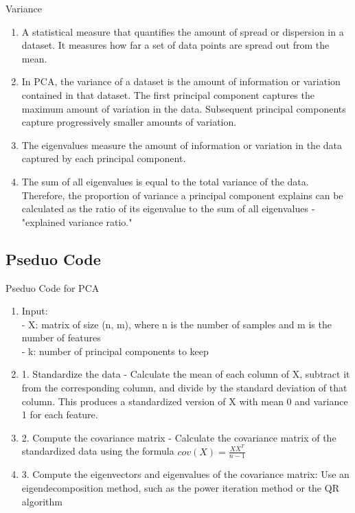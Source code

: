 \documentclass{beamer}
\begin{document}
\begin{frame}{Variance}
    \begin{enumerate}
        \item A statistical measure that quantifies the amount of spread or dispersion in a dataset. It measures how far a set of data points are spread out from the mean.
        \item  In PCA, the variance of a dataset is the amount of information or variation contained in that dataset. The first principal component captures the maximum amount of variation in the data. Subsequent principal components capture progressively smaller amounts of variation.
        \item The eigenvalues measure the amount of information or variation in the data captured by each principal component.
        \item The sum of all eigenvalues is equal to the total variance of the data. Therefore, the proportion of variance a principal component explains can be calculated as the ratio of its eigenvalue to the sum of all eigenvalues - "explained variance ratio."

    \end{enumerate}
\end{frame}

\subsection{Pseduo Code}
\begin{frame}{Pseduo Code for PCA}
    \begin{enumerate}
        \item Input: \\
              - X: matrix of size (n, m), where n is the number of samples and m is the number of features\\
              - k: number of principal components to keep
        \item 1. Standardize the data - Calculate the mean of each column of X, subtract it from the corresponding column, and divide by the standard deviation of that column. This produces a standardized version of X with mean 0 and variance 1 for each feature.
        \item 2. Compute the covariance matrix - Calculate the covariance matrix of the standardized data using the formula $cov(X) = \frac{XX^T}{n - 1}$
        \item 3. Compute the eigenvectors and eigenvalues of the covariance matrix: Use an eigendecomposition method, such as the power iteration method or the QR algorithm

    \end{enumerate}
\end{frame}
\end{document}
